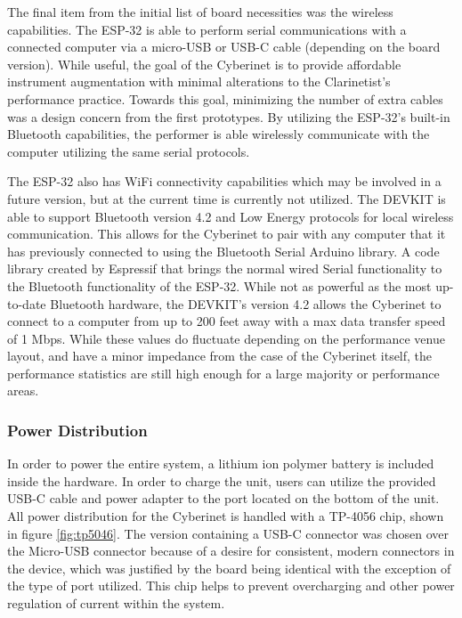 The final item from the initial list of board necessities was the wireless capabilities. The ESP-32 is able to perform serial communications with a connected computer via a micro-USB or USB-C cable (depending on the board version). While useful, the goal of the Cyberinet is to provide affordable instrument augmentation with minimal alterations to the Clarinetist's performance practice. Towards this goal, minimizing the number of extra cables was a design concern from the first prototypes. By utilizing the ESP-32's built-in Bluetooth capabilities, the performer is able wirelessly communicate with the computer utilizing the same serial protocols.

The ESP-32 also has WiFi connectivity capabilities which may be involved in a future version, but at the current time is currently not utilized. The DEVKIT is able to support Bluetooth version 4.2 and Low Energy protocols for local wireless communication. This allows for the Cyberinet to pair with any computer that it has previously connected to using the Bluetooth Serial Arduino library. A code library created by Espressif that brings the normal wired Serial functionality to the Bluetooth functionality of the ESP-32. While not as powerful as the most up-to-date Bluetooth hardware, the DEVKIT's version 4.2 allows the Cyberinet to connect to a computer from up to 200 feet away with a max data transfer speed of 1 Mbps\cite{btSpecs}. While these values do fluctuate depending on the performance venue layout, and have a minor impedance from the case of the Cyberinet itself, the performance statistics are still high enough for a large majority or performance areas.

\subsubsection{Power Distribution}
In order to power the entire system, a lithium ion polymer battery is included inside the hardware. In order to charge the unit, users can utilize the provided USB-C cable and power adapter to the port located on the bottom of the unit. All power distribution for the Cyberinet is handled with a TP-4056 chip, shown in figure \ref{fig:tp5046}. The version containing a USB-C connector was chosen over the Micro-USB connector because of a desire for consistent, modern connectors in the device, which was justified by the board being identical with the exception of the type of port utilized. This chip helps to prevent overcharging and other power regulation of current within the system.


